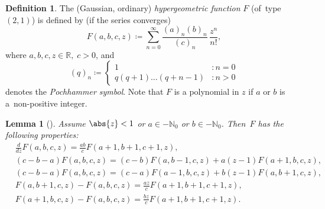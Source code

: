 \documentclass[JEP,XML,SOM,NoFloatCountersInSection,Unicode,published]{cedram}
\newtheorem{lemma}[theorem]{Lemma}
\theoremstyle{definition}
\newtheorem{definition}[theorem]{Definition}
\DeclarePairedDelimiter{\abs}\lvert\rvert
\newcommand{\R}{\ensuremath{\mathbb{R}}}
\newcommand{\N}{\ensuremath{\mathbb{N}}}
\begin{document}
\begin{definition}
The (Gaussian, ordinary)\! \emph{hypergeometric function} $F$ \!(of~type\,$(2,\!1)$) is defined by (if the series converges)
\[
F(a,b,c,z)\coloneqq\sum_{n=0}^\infty \frac{(a)_n(b)_n}{(c)_n}\,\frac{z^n}{n!},
\]
where $a,b,c,z\in\R,\;c>0$, and
\[
(q)_n\coloneqq
\begin{cases}
1&:n=0\\
q(q+1)\ldots(q+n-1)&:n>0
\end{cases}
\]
denotes the \emph{Pochhammer symbol}. Note that $F$ is a polynomial in $z$ if $a$ or $b$ is a~non-positive integer.
\end{definition}
\begin{lemma}[]\label{hypergeo} Assume $\abs{z}<1$ or $a\in-\N_0$ or $b\in-\N_0$. Then~$F$ has the following properties:
\begin{align}
\tag{i}\label{prop1}&\frac{d}{dz}F(a,b,c,z)=\frac{ab}{c}F(a+1,b+1,c+1,z),\\
\tag{ii}\label{prop2}&(c-b-a)F(a,b,c,z)=(c-b)F(a,b-1,c,z)+a(z-1)F(a+1,b,c,z),\\
\tag{iii}\label{prop2'}&(c-b-a)F(a,b,c,z)=(c-a)F(a-1,b,c,z)+b(z-1)F(a,b+1,c,z),\\
\tag{iv}\label{prop3}&F(a,b+1,c,z)-F(a,b,c,z)=\frac{az}{c}F(a+1,b+1,c+1,z),\\
\tag{v}\label{prop3'}&F(a+1,b,c,z)-F(a,b,c,z)=\frac{bz}{c}F(a+1,b+1,c+1,z).
\end{align}
\end{lemma}
\end{document}
